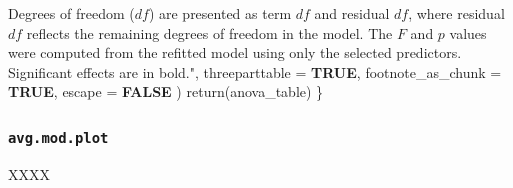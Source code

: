 \documentclass[
  bookmarksnumbered]{article}
\newenvironment{Shaded}{\begin{snugshade}}{\end{snugshade}}
\newcommand{\AttributeTok}[1]{\textcolor[rgb]{0.80,0.80,0.80}{#1}}
\newcommand{\ConstantTok}[1]{\textcolor[rgb]{0.86,0.64,0.64}{\textbf{#1}}}
\newcommand{\FunctionTok}[1]{\textcolor[rgb]{0.94,0.94,0.56}{#1}}
\newcommand{\NormalTok}[1]{\textcolor[rgb]{0.80,0.80,0.80}{#1}}
\newcommand{\StringTok}[1]{\textcolor[rgb]{0.80,0.58,0.58}{#1}}
\begin{document}
\begin{Shaded}
\begin{Highlighting}[]
\StringTok{      Degrees of freedom ($df$) are presented as term $df$ and residual $df$, where residual }
\StringTok{      $df$ reflects the remaining degrees of freedom in the model. The $F$ and $p$ values were}
\StringTok{      computed from the refitted model using only the selected predictors.}
\StringTok{      Significant effects are in bold."}\NormalTok{,}
      \AttributeTok{threeparttable =} \ConstantTok{TRUE}\NormalTok{, }
      \AttributeTok{footnote\_as\_chunk =} \ConstantTok{TRUE}\NormalTok{, }
      \AttributeTok{escape =} \ConstantTok{FALSE}
\NormalTok{    )}
  \FunctionTok{return}\NormalTok{(anova\_table)}
\NormalTok{\}}
\end{Highlighting}
\end{Shaded}

\subsubsection{\texorpdfstring{\texttt{avg.mod.plot}}{avg.mod.plot}}\label{avg.mod.plot}

XXXX
\end{document}
